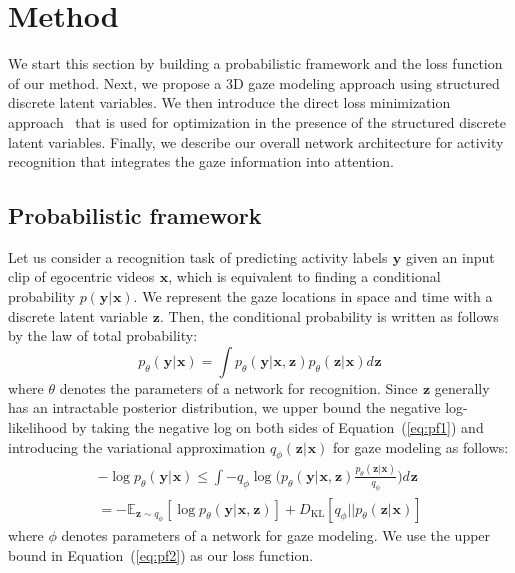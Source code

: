 \documentclass[10pt,twocolumn,letterpaper]{article}
\newcommand{\varx}{\mathbf{\mspace{1mu}x}}
\newcommand{\vary}{\mathbf{\mspace{1mu}y}}
\newcommand{\varz}{\mathbf{\mspace{1mu}z}}
\begin{document}
\section{Method} \label{sec:method}
We start this section by building a probabilistic framework and the loss function of our method. Next, we propose a 3D gaze modeling approach using structured discrete latent variables. We then introduce the direct loss minimization approach~\cite{lorberbom2018direct} that is used for optimization in the presence of the structured discrete latent variables. Finally, we describe our overall network architecture for activity recognition that integrates the gaze information into attention.

\subsection{Probabilistic framework} \label{subsec:framework}
Let us consider a recognition task of predicting activity labels $\vary$ given an input clip of egocentric videos $\varx$, which is equivalent to finding a conditional probability $p(\vary|\varx)$. We represent the gaze locations in space and time with a discrete latent variable $\varz$. Then, the conditional probability is written as follows by the law of total probability:
\begin{equation}
\label{eq:pf1}
p_{\theta}(\vary|\varx) = \int p_{\theta}(\vary|\varx,\varz)p_{\theta}(\varz|\varx)d\varz
\end{equation}
where $\theta$ denotes the parameters of a network for recognition. Since $\varz$ generally has an intractable posterior distribution, we upper bound the negative log-likelihood by taking the negative log on both sides of Equation~(\ref{eq:pf1}) and introducing the variational approximation $q_{\phi}(\varz|\varx)$ for gaze modeling as follows:
\begin{multline}
\label{eq:pf2}
-\log p_{\theta}(\vary|\varx)
\leq \int -q_{\phi} \log \Big(p_{\theta}(\vary|\varx,\varz)\frac{p_{\theta}(\varz|\varx)}{q_{\phi}} \Big) d\varz \\
= -\mathbb{E}_{\varz \sim q_{\phi}}[\log p_{\theta}(\vary|\varx,\varz)] + D_{\mathrm{KL}}[q_{\phi}||p_{\theta}(\varz|\varx)]
\end{multline}
where $\phi$ denotes parameters of a network for gaze modeling. We use the upper bound in Equation~(\ref{eq:pf2}) as our loss function.
\end{document}
